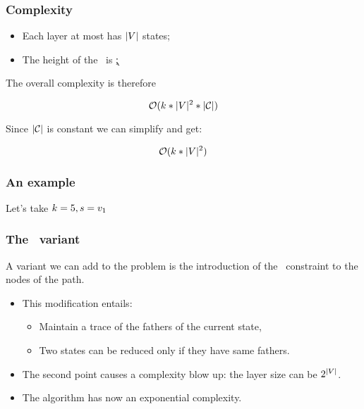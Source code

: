 \begin{frame}
  \frametitle{Complexity}

  \begin{itemize}
    \item Each layer at most has $| V |$ states;
    \item The height of the \mdd\ is \k;
  \end{itemize}

  The overall complexity is therefore
  \begin{center}
    \alert{$$\mathcal{O}(k * | V | ^ 2 * | \mathcal{C} |)$$}
  \end{center}

  \mysep{}

  Since $|\mathcal{C}|$ is constant we can simplify and get:

  \begin{center}
    \alert{$$\mathcal{O}(k * | V | ^ 2) $$}
  \end{center}


\end{frame}

\begin{frame}
  \frametitle{An example}

  

  Let's take $k = 5, s = v_1$

\end{frame}

\begin{frame}
  \frametitle{The \alldiff\ variant}

  A variant we can add to the problem is the introduction of the \alldiff\ constraint to the nodes of the path.

  \begin{itemize}
    \item This modification entails:
          \begin{itemize}
            \item Maintain a trace of the fathers of the current state,
            \item Two states can be reduced only if they have same fathers.
          \end{itemize}
    \item The second point causes a complexity blow up: the layer size can be $2^{|V|}$.
    \item The algorithm has now an exponential complexity.
  \end{itemize}

\end{frame}

